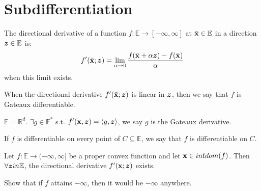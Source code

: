 \documentclass[11pt]{article}
\begin{document}
\section{Subdifferentiation}
\begin{definition}
    The directional derivative of a function $f: \mathbb{E} \to [-\infty,\infty]$ at $\bar{{\mathbf{x}}} \in \mathbb{E}$
    in a direction ${\bm{z}} \in \mathbb{E}$ is:
    \begin{align*}
        f'(\bar{{\mathbf{x}}}; {\bm{z}}) = \lim_{\alpha \to 0} \frac{f(\bar{{\mathbf{x}}}+\alpha {\bm{z}}) - f(\bar{{\mathbf{x}}})}{\alpha}
    \end{align*}
    when this limit exists.

    When the directional derivative $f'(\bar{{\mathbf{x}}}; {\bm{z}})$ is linear in ${\bm{z}}$, then we say that 
    $f$ is Gateaux differentiable.

    $\mathbb{E} = \mathbb{R}^{d}$. $\exists g \in \mathbb{E}^{*}$ s.t. $f'({\mathbf{x}},{\bm{z}}) = \langle 
        g, {\bm{z}}
    \rangle$, we say $g$ is the Gateaux derivative.

    If $f$ is differentiable on every point of $C \subseteq \mathbb{E}$, we say that $f$ is differentiable on
    $C$.
\end{definition}

\begin{theorem}
    Let $f: \mathbb{E} \to (-\infty,\infty]$ be a proper convex function and let ${\mathbf{x}} \in intdom(f)$.
    Then $\forall {\bm{z}} in \mathbb{E}$, the directional derivative $f'({\mathbf{x}};{\bm{z}})$ exists.

\end{theorem}
\begin{exercise}
    Show that if $f$ attains $-\infty$, then it would be $-\infty$ anywhere.
\end{exercise}
\end{document}
